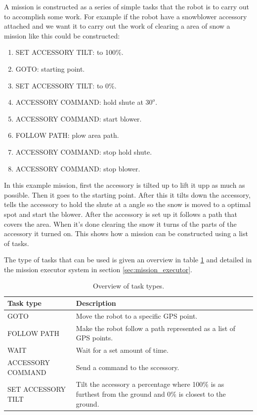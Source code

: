 \documentclass[main.tex]{subfiles}
\begin{document}
A mission is constructed as a series of simple tasks that the robot is to carry out to accomplish some work.
For example if the robot have a snowblower accessory attached and we want it to carry out the work of clearing a area of snow a mission like this could be constructed:
\begin{enumerate}
    \item SET ACCESSORY TILT: to 100\%.
    \item GOTO: starting point.
    \item SET ACCESSORY TILT: to 0\%.
    \item ACCESSORY COMMAND: hold shute at $30^o$.
    \item ACCESSORY COMMAND: start blower.
    \item FOLLOW PATH: plow area path.
    \item ACCESSORY COMMAND: stop hold shute.
    \item ACCESSORY COMMAND: stop blower.
\end{enumerate}
In this example mission, first the accessory is tilted up to lift it upp as much as possible.
Then it goes to the starting point. After this it tilts down the accessory, tells the accessory to hold the shute at a angle so the snow is moved to a optimal spot and start the blower.
After the accessory is set up it follows a path that covers the area. When it's done clearing the snow it turns of the parts of the accessory it turned on.
This shows how a mission can be constructed using a list of tasks.

The type of tasks that can be used is given an overview in table \ref{tab:task_types_over} and detailed in the mission executor system in section \ref{sec:mission_executor}.
\begin{table}[H]
    \centering
    \begin{tabular}{| m{3cm} | m{5cm} |}
        \hline
        Task type & Description \\
        \hline \hline
        GOTO & Move the robot to a specific GPS point. \\
        \hline
        FOLLOW PATH & Make the robot follow a path represented as a list of GPS points. \\
        \hline
        WAIT & Wait for a set amount of time. \\
        \hline
        ACCESSORY COMMAND & Send a command to the sccessory. \\
        \hline
        SET ACCESSORY TILT & Tilt the accessory a percentage where 100\% is as furthest from the ground and 0\% is closest to the ground. \\
        \hline
    \end{tabular}
    \caption{Overview of task types.}
    \label{tab:task_types_over}
\end{table}
\end{document}
